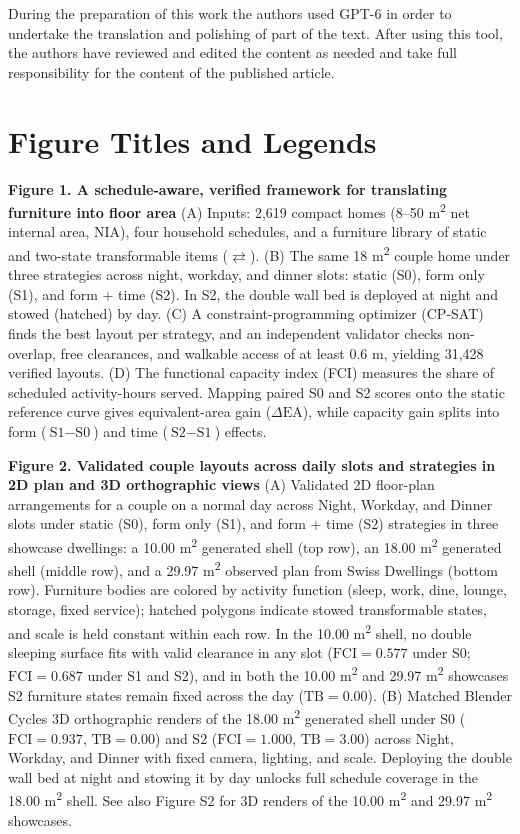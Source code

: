 \documentclass[12pt,letterpaper]{article}
\begin{document}
During the preparation of this work the authors used GPT-6 in order to undertake the translation and polishing of part of the text. After using this tool, the authors have reviewed and edited the content as needed and take full responsibility for the content of the published article.

\section{Figure Titles and Legends}\label{figure-titles-and-legends}

\textbf{Figure 1. A schedule-aware, verified framework for translating furniture into floor area} (A) Inputs: 2,619 compact homes (8--50 m\textsuperscript{2} net internal area, NIA), four household schedules, and a furniture library of static and two-state transformable items (\ensuremath{\rightleftarrows}). (B) The same 18 m\textsuperscript{2} couple home under three strategies across night, workday, and dinner slots: static (S0), form only (S1), and form + time (S2). In S2, the double wall bed is deployed at night and stowed (hatched) by day. (C) A constraint-programming optimizer (CP-SAT) finds the best layout per strategy, and an independent validator checks non-overlap, free clearances, and walkable access of at least 0.6 m, yielding 31,428 verified layouts. (D) The functional capacity index (FCI) measures the share of scheduled activity-hours served. Mapping paired S0 and S2 scores onto the static reference curve gives equivalent-area gain (\(\Delta\text{EA}\)), while capacity gain splits into form (\(\text{S1} - \text{S0}\)) and time (\(\text{S2} - \text{S1}\)) effects.

\textbf{Figure 2. Validated couple layouts across daily slots and strategies in 2D plan and 3D orthographic views} (A) Validated 2D floor-plan arrangements for a couple on a normal day across Night, Workday, and Dinner slots under static (S0), form only (S1), and form + time (S2) strategies in three showcase dwellings: a 10.00 m\textsuperscript{2} generated shell (top row), an 18.00 m\textsuperscript{2} generated shell (middle row), and a 29.97 m\textsuperscript{2} observed plan from Swiss Dwellings (bottom row). Furniture bodies are colored by activity function (sleep, work, dine, lounge, storage, fixed service); hatched polygons indicate stowed transformable states, and scale is held constant within each row. In the 10.00 m\textsuperscript{2} shell, no double sleeping surface fits with valid clearance in any slot (\(\text{FCI} = 0.577\) under S0; \(\text{FCI} = 0.687\) under S1 and S2), and in both the 10.00 m\textsuperscript{2} and 29.97 m\textsuperscript{2} showcases S2 furniture states remain fixed across the day (\(\text{TB} = 0.00\)). (B) Matched Blender Cycles 3D orthographic renders of the 18.00 m\textsuperscript{2} generated shell under S0 (\(\text{FCI} = 0.937\), \(\text{TB} = 0.00\)) and S2 (\(\text{FCI} = 1.000\), \(\text{TB} = 3.00\)) across Night, Workday, and Dinner with fixed camera, lighting, and scale. Deploying the double wall bed at night and stowing it by day unlocks full schedule coverage in the 18.00 m\textsuperscript{2} shell. See also Figure S2 for 3D renders of the 10.00 m\textsuperscript{2} and 29.97 m\textsuperscript{2} showcases.
\end{document}
